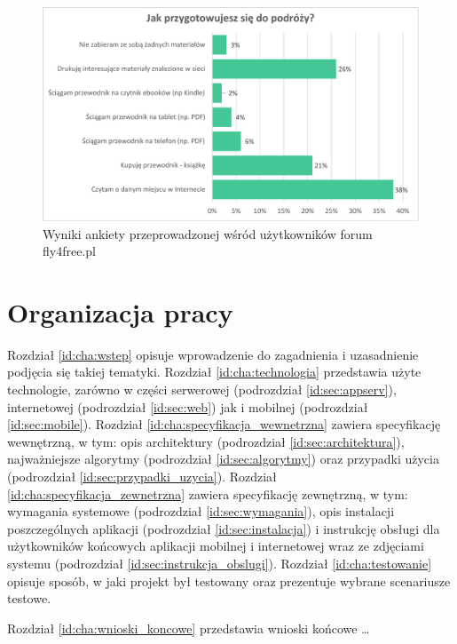 \documentclass[a4paper]{book}
\begin{document}
			\begin{figure}		
				\centering
				\includegraphics[width=1.0\textwidth]{images/fly4freeAnkieta.pdf}
				\caption{Wyniki ankiety przeprowadzonej wśród użytkowników forum fly4free.pl}
				\label{fig:fly4freeAnkieta}
			\end{figure}
		
			\section{Organizacja pracy}
	
			Rozdział \ref{id:cha:wstep} opisuje wprowadzenie do zagadnienia i uzasadnienie podjęcia się takiej tematyki. 
			Rozdział \ref{id:cha:technologia} przedstawia użyte technologie, zarówno w części serwerowej (podrozdział \ref{id:sec:appserv}), internetowej (podrozdział \ref{id:sec:web}) jak i mobilnej (podrozdział \ref{id:sec:mobile}). 
			Rozdział \ref{id:cha:specyfikacja_wewnetrzna} zawiera specyfikację wewnętrzną, w tym: opis architektury (podrozdział \ref{id:sec:architektura}), najważniejsze algorytmy (podrozdział \ref{id:sec:algorytmy}) oraz przypadki użycia (podrozdział \ref{id:sec:przypadki_uzycia}). 
			Rozdział \ref{id:cha:specyfikacja_zewnetrzna} zawiera specyfikację zewnętrzną, w tym: wymagania systemowe (podrozdział \ref{id:sec:wymagania}), opis instalacji poszczególnych aplikacji (podrozdział \ref{id:sec:instalacja}) i instrukcję obsługi dla użytkowników końcowych aplikacji mobilnej i internetowej wraz ze zdjęciami systemu (podrozdział \ref{id:sec:instrukcja_obslugi}).
			Rozdział \ref{id:cha:testowanie} opisuje sposób, w jaki projekt był testowany oraz prezentuje wybrane scenariusze testowe. 
			
			Rozdział \ref{id:cha:wnioski_koncowe} przedstawia wnioski końcowe \ldots				
	
\end{document}
